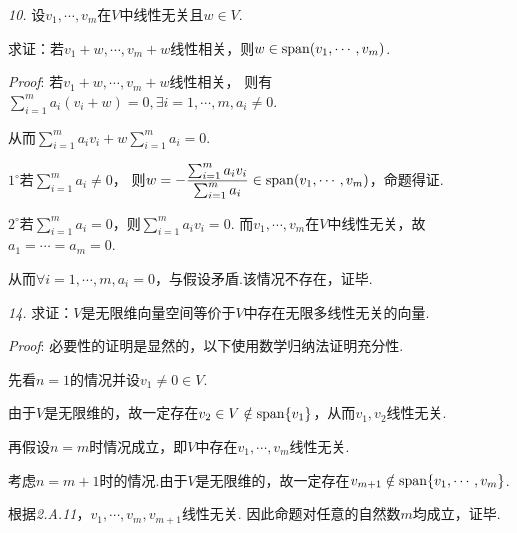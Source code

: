 \textit{10.}
设$v_1,\cdots,v_m$在$V$中线性无关且$w\in V$.

求证：若$v_1+w,\cdots,v_m+w$线性相关，则$w\in \mathrm{span} (v_1,\cdots,v_m)$.

\textit{Proof}:
若$v_1+w,\cdots,v_m+w$线性相关，
则有$\sum_{i=1}^m a_i(v_i+w)=0,\exists i=1,\cdots,m,a_i\ne 0$.

从而$\sum_{i=1}^m a_iv_i+w\sum_{i=1}^m a_i=0$.

$1^{\circ}$若$\sum_{i=1}^m a_i\ne 0$，
则$w=-\dfrac{\sum_{i=1}^m a_iv_i}{\sum_{i=1}^m a_i}\in \mathrm{span} (v_1,\cdots,v_m)$，命题得证.

$2^{\circ}$若$\sum_{i=1}^m a_i=0$，则$\sum_{i=1}^m a_iv_i=0$.
而$v_1,\cdots,v_m$在$V$中线性无关，故$a_1=\cdots=a_m=0$.

从而$\forall i=1,\cdots,m, a_i=0$，与假设矛盾.该情况不存在，证毕.

\hspace*{\fill}

\textit{14.}
求证：$V$是无限维向量空间等价于$V$中存在无限多线性无关的向量.

\textit{Proof}:
必要性的证明是显然的，以下使用数学归纳法证明充分性.

先看$n=1$的情况并设$v_1 \ne 0 \in V$.

由于$V$是无限维的，故一定存在$v_2 \in V \notin \mathrm{span} \{v_1\}$，从而$v_1,v_2$线性无关.

再假设$n=m$时情况成立，即$V$中存在$v_1,\cdots,v_m$线性无关.

考虑$n=m+1$时的情况.由于$V$是无限维的，故一定存在$v_{m+1} \notin \mathrm{span} \{v_1,\cdots,v_m\}$.

根据\textit{2.A.11}，$v_1,\cdots,v_m,v_{m+1}$线性无关.
因此命题对任意的自然数$m$均成立，证毕.

